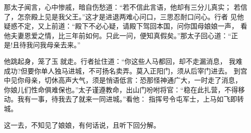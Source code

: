 那太子闻言，心中惨戚，暗自伤愁道：“若不信此言语，他却有三分儿真实；
若信了，怎奈殿上见是我父王。”这才是进退两难心问口，三思忍耐口问心。行者
见他疑惑不定，又上前道：“殿下不必心疑，请殿下驾回本国，问你国母娘娘一声，
看他夫妻恩爱之情，比三年前如何。只此一问，便知真假矣。”那太子回心道：“正
是!且待我问我母亲去来。”

他跳起身，笼了玉就走。行者扯住道：“你这些人马都回，却不走漏消息，
我难成功?但要你单人独马进城，不可扬名卖弄。莫入正阳门，须从后宰门进去。
到宫中见你母亲，切休高声大气，须是悄语低言：恐那怪神通广大，一时走了消息，
你娘儿们性命俱难保也。”太子谨遵教命，出山门吩咐将官：“稳在此扎营，不得移
动。我有一事，待我去了就来一同进城。”看他：
指挥号令屯军士，上马如飞即转城。

这一去，不知见了娘娘，有何话说，且听下回分解。